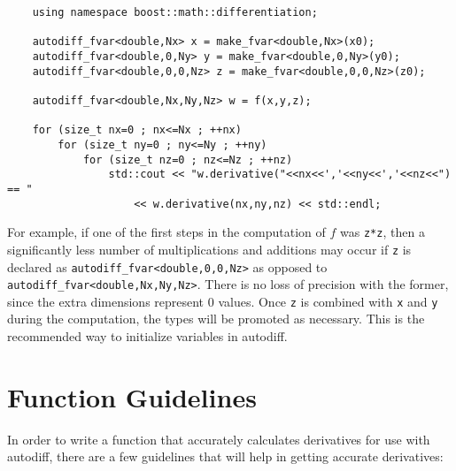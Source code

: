 \documentclass{article}
\begin{document}
\begin{verbatim}
    using namespace boost::math::differentiation;

    autodiff_fvar<double,Nx> x = make_fvar<double,Nx>(x0);
    autodiff_fvar<double,0,Ny> y = make_fvar<double,0,Ny>(y0);
    autodiff_fvar<double,0,0,Nz> z = make_fvar<double,0,0,Nz>(z0);

    autodiff_fvar<double,Nx,Ny,Nz> w = f(x,y,z);

    for (size_t nx=0 ; nx<=Nx ; ++nx)
        for (size_t ny=0 ; ny<=Ny ; ++ny)
            for (size_t nz=0 ; nz<=Nz ; ++nz)
                std::cout << "w.derivative("<<nx<<','<<ny<<','<<nz<<") == "
                    << w.derivative(nx,ny,nz) << std::endl;
\end{verbatim}
For example, if one of the first steps in the computation of $f$ was {\tt z*z}, then a significantly less number of
multiplications and additions may occur if {\tt z} is declared as {\tt autodiff\_fvar<double,0,0,Nz>} as opposed to \\
{\tt autodiff\_fvar<double,Nx,Ny,Nz>}. There is no loss of precision with the former, since the extra dimensions
represent 0 values. Once {\tt z} is combined with {\tt x} and {\tt y} during the computation, the types will be
promoted as necessary.  This is the recommended way to initialize variables in autodiff.

\section{Function Guidelines}

In order to write a function that accurately calculates derivatives for use with autodiff, there are a few guidelines
that will help in getting accurate derivatives:
\end{document}
